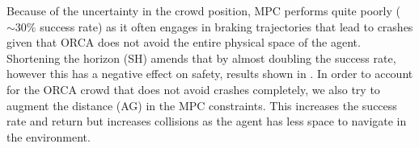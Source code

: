 \documentclass[letterpaper,conference,10pt]{IEEEconf}
\begin{document}
Because of the uncertainty in the crowd position, MPC performs quite poorly ($\sim 30\%$ success rate) as it often engages in braking trajectories that lead to crashes given that ORCA does not avoid the entire physical space of the agent. Shortening the horizon (SH) amends that by almost doubling the success rate, however this has a negative effect on safety, results shown in . In order to account for the ORCA crowd that does not avoid crashes completely, we also try to augment the distance (AG) in the MPC constraints. This increases the success rate and return but increases collisions as the agent has less space to navigate in the environment.
\end{document}
